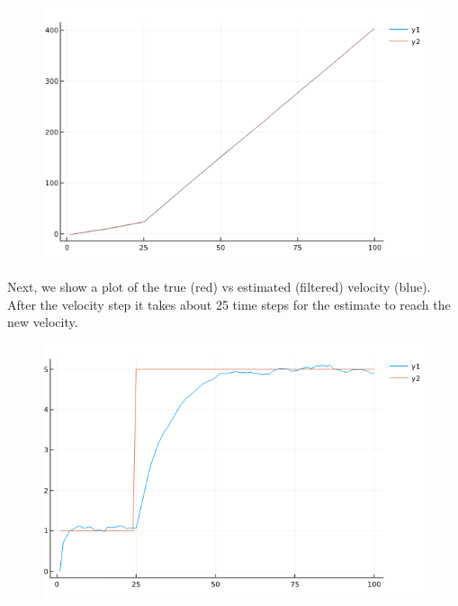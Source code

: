 \begin{figure}[hbt!]
\centering
\includegraphics[scale=0.5]{images/kalman_1_1.png}
\end{figure}

Next, we show a plot of the true (red) vs estimated (filtered) velocity (blue). After the velocity step it takes about 25 time steps for the estimate to reach the new velocity.


\begin{figure}[hbt!]
\centering
\includegraphics[scale=0.5]{images/kalman_1_2.png}
\end{figure}


